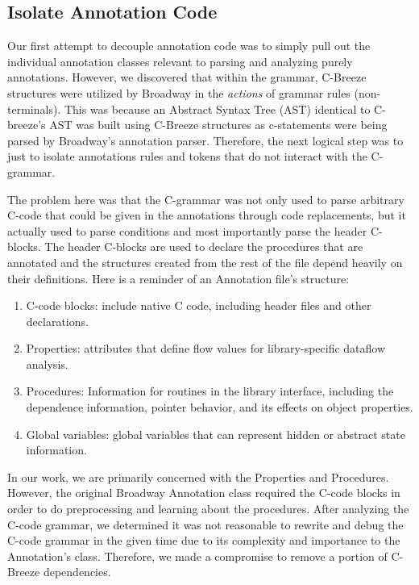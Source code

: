 \subsection{Isolate Annotation Code}
Our first attempt to decouple annotation code was to simply pull out the individual annotation classes relevant to parsing and analyzing purely annotations. However, we discovered that within the grammar, C-Breeze structures were utilized by Broadway in the \textit{actions} of grammar rules (non-terminals). This was because an Abstract Syntax Tree (AST) identical to C-breeze's AST was built using C-Breeze structures as c-statements were being parsed by Broadway's annotation parser.  Therefore, the next logical step was to just to isolate annotations rules and tokens that do not interact with the C-grammar. 

The problem here was that the C-grammar was not only used to parse arbitrary C-code that could be given in the annotations through code replacements, but it actually used to parse conditions and most importantly parse the header C-blocks. The header C-blocks are used to declare the procedures that are annotated and the structures created from the rest of the file depend heavily on their definitions. Here is a reminder of an Annotation file's structure:

\begin{enumerate}
\item  C-code blocks: include native C code, including header files and other declarations.
\item Properties: attributes that define flow values for library-specific dataflow analysis.
\item Procedures: Information for routines in the library interface, including the dependence information, pointer behavior, and its effects on object properties.
\item Global variables:  global variables that  can represent hidden or abstract state information.
\end{enumerate}

In our work, we are primarily concerned with the Properties and Procedures. However, the original Broadway Annotation class required the C-code blocks in order to do preprocessing and learning about the procedures. After analyzing the C-code grammar, we determined it was not reasonable to rewrite and debug the C-code grammar in the given time due to its complexity and importance to the Annotation's class. Therefore, we made a compromise to remove a portion of C-Breeze dependencies. 

